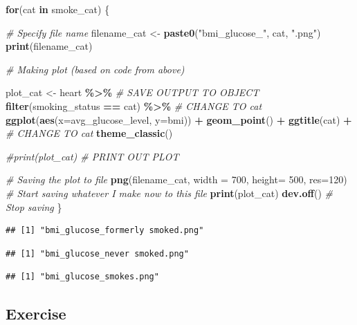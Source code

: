 \documentclass[
]{book}
\newenvironment{Shaded}{\begin{snugshade}}{\end{snugshade}}
\newcommand{\AttributeTok}[1]{\textcolor[rgb]{0.13,0.29,0.53}{#1}}
\newcommand{\CommentTok}[1]{\textcolor[rgb]{0.56,0.35,0.01}{\textit{#1}}}
\newcommand{\ControlFlowTok}[1]{\textcolor[rgb]{0.13,0.29,0.53}{\textbf{#1}}}
\newcommand{\DecValTok}[1]{\textcolor[rgb]{0.00,0.00,0.81}{#1}}
\newcommand{\FunctionTok}[1]{\textcolor[rgb]{0.13,0.29,0.53}{\textbf{#1}}}
\newcommand{\NormalTok}[1]{#1}
\newcommand{\OtherTok}[1]{\textcolor[rgb]{0.56,0.35,0.01}{#1}}
\newcommand{\SpecialCharTok}[1]{\textcolor[rgb]{0.81,0.36,0.00}{\textbf{#1}}}
\newcommand{\StringTok}[1]{\textcolor[rgb]{0.31,0.60,0.02}{#1}}
\begin{document}
\begin{Shaded}
\begin{Highlighting}[]
\ControlFlowTok{for}\NormalTok{(cat }\ControlFlowTok{in}\NormalTok{ smoke\_cat) \{}
  
  \CommentTok{\# Specify file name}
\NormalTok{  filename\_cat }\OtherTok{\textless{}{-}} \FunctionTok{paste0}\NormalTok{(}\StringTok{"bmi\_glucose\_"}\NormalTok{, cat, }\StringTok{".png"}\NormalTok{)}
  \FunctionTok{print}\NormalTok{(filename\_cat)}
  
  \CommentTok{\# Making plot (based on code from above)}
  
\NormalTok{  plot\_cat }\OtherTok{\textless{}{-}}\NormalTok{ heart }\SpecialCharTok{\%\textgreater{}\%} \CommentTok{\# SAVE OUTPUT TO OBJECT}
  \FunctionTok{filter}\NormalTok{(smoking\_status }\SpecialCharTok{==}\NormalTok{ cat) }\SpecialCharTok{\%\textgreater{}\%} \CommentTok{\# CHANGE TO cat}
  \FunctionTok{ggplot}\NormalTok{(}\FunctionTok{aes}\NormalTok{(}\AttributeTok{x=}\NormalTok{avg\_glucose\_level, }\AttributeTok{y=}\NormalTok{bmi)) }\SpecialCharTok{+}
  \FunctionTok{geom\_point}\NormalTok{() }\SpecialCharTok{+} 
  \FunctionTok{ggtitle}\NormalTok{(cat) }\SpecialCharTok{+} \CommentTok{\# CHANGE TO cat}
  \FunctionTok{theme\_classic}\NormalTok{()}
  
  \CommentTok{\#print(plot\_cat) \# PRINT OUT PLOT}
  
  \CommentTok{\# Saving the plot to file }
  \FunctionTok{png}\NormalTok{(filename\_cat, }\AttributeTok{width =} \DecValTok{700}\NormalTok{, }\AttributeTok{height=} \DecValTok{500}\NormalTok{, }\AttributeTok{res=}\DecValTok{120}\NormalTok{) }\CommentTok{\# Start saving whatever I make now to this file }
  \FunctionTok{print}\NormalTok{(plot\_cat)}
  \FunctionTok{dev.off}\NormalTok{() }\CommentTok{\# Stop saving}
\NormalTok{\}}
\end{Highlighting}
\end{Shaded}

\begin{verbatim}
## [1] "bmi_glucose_formerly smoked.png"
\end{verbatim}

\begin{verbatim}
## [1] "bmi_glucose_never smoked.png"
\end{verbatim}

\begin{verbatim}
## [1] "bmi_glucose_smokes.png"
\end{verbatim}

\subsection{Exercise}\label{exercise-7}
\end{document}
